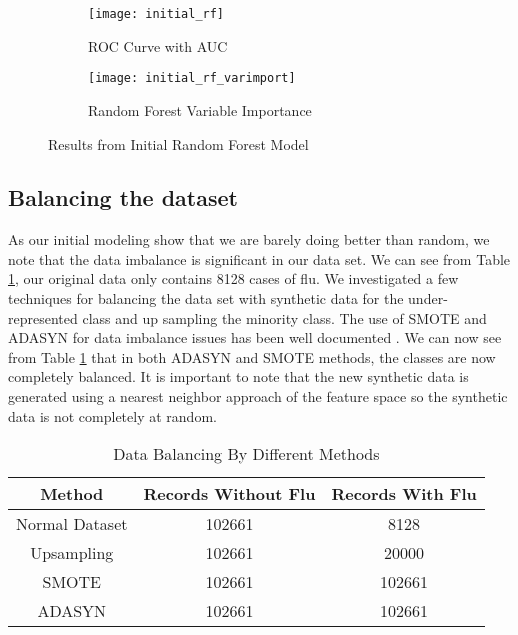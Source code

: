 \documentclass[twoside,11pt]{article}
\begin{document}
\begin{figure}[h]
\centering
\begin{subfigure}{.5\textwidth}
  \centering
  \texttt{[image: initial\_rf]}
  \caption{ROC Curve with AUC}
  \label{fig:initial_roc}
\end{subfigure}%
\begin{subfigure}{.5\textwidth}
  \centering
  \texttt{[image: initial\_rf\_varimport]}
  \caption{Random Forest Variable Importance}
  \label{fig:initial_varimport}
\end{subfigure}
\caption{Results from Initial Random Forest Model}
\label{fig:initial_results}
\end{figure}

\subsection*{Balancing the dataset}

As our initial modeling show that we are barely doing better than random, we
note that the data imbalance is significant in our data set. We can see from
Table \ref{data_balancing}, our original data only contains 8128 cases of flu.
We investigated a few techniques for balancing the data set with synthetic data for the
under-represented class and up sampling the minority class.\citep{SMOTE, ADASYN}  The use of SMOTE and
ADASYN for data imbalance issues has been well documented \citep{Blagus2013}. We
can now see from Table \ref{data_balancing} that in both ADASYN and SMOTE
methods, the classes are now completely balanced. It is important to note that
the new synthetic data is generated using a nearest neighbor approach of the
feature space so the synthetic data is not completely at random. \citep{SMOTE} 

\begin{table}[h]
\centering
\caption{Data Balancing By Different Methods}
\label{data_balancing}
\begin{tabular}{ccc}
\hline
  Method & Records Without Flu & Records With Flu\\ \hline
  Normal Dataset & 102661 & 8128\\
  Upsampling & 102661 & 20000\\
  SMOTE & 102661 & 102661\\
  ADASYN & 102661 & 102661\\
\end{tabular}
\end{table}
\end{document}
